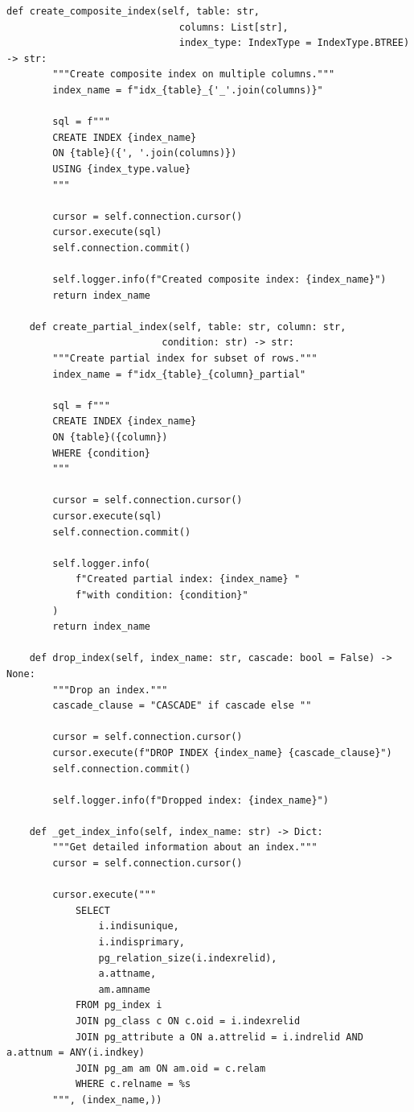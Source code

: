 \begin{lstlisting}[style=python, caption=IndexManager with Smart Recommendations]
    def create_composite_index(self, table: str,
                              columns: List[str],
                              index_type: IndexType = IndexType.BTREE) -> str:
        """Create composite index on multiple columns."""
        index_name = f"idx_{table}_{'_'.join(columns)}"

        sql = f"""
        CREATE INDEX {index_name}
        ON {table}({', '.join(columns)})
        USING {index_type.value}
        """

        cursor = self.connection.cursor()
        cursor.execute(sql)
        self.connection.commit()

        self.logger.info(f"Created composite index: {index_name}")
        return index_name

    def create_partial_index(self, table: str, column: str,
                           condition: str) -> str:
        """Create partial index for subset of rows."""
        index_name = f"idx_{table}_{column}_partial"

        sql = f"""
        CREATE INDEX {index_name}
        ON {table}({column})
        WHERE {condition}
        """

        cursor = self.connection.cursor()
        cursor.execute(sql)
        self.connection.commit()

        self.logger.info(
            f"Created partial index: {index_name} "
            f"with condition: {condition}"
        )
        return index_name

    def drop_index(self, index_name: str, cascade: bool = False) -> None:
        """Drop an index."""
        cascade_clause = "CASCADE" if cascade else ""

        cursor = self.connection.cursor()
        cursor.execute(f"DROP INDEX {index_name} {cascade_clause}")
        self.connection.commit()

        self.logger.info(f"Dropped index: {index_name}")

    def _get_index_info(self, index_name: str) -> Dict:
        """Get detailed information about an index."""
        cursor = self.connection.cursor()

        cursor.execute("""
            SELECT
                i.indisunique,
                i.indisprimary,
                pg_relation_size(i.indexrelid),
                a.attname,
                am.amname
            FROM pg_index i
            JOIN pg_class c ON c.oid = i.indexrelid
            JOIN pg_attribute a ON a.attrelid = i.indrelid AND a.attnum = ANY(i.indkey)
            JOIN pg_am am ON am.oid = c.relam
            WHERE c.relname = %s
        """, (index_name,))


\end{lstlisting}
